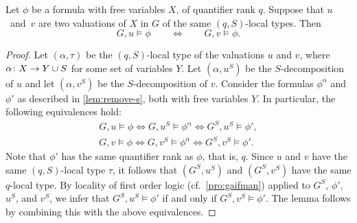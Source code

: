 \begin{lemma}\label{lem:coloring}
	Let $\phi$ be a formula with
free variables $X$, of quantifier rank $q$.
	Suppose that $u$~and~$v$ are two valuations of $X$  in $G$ of the same $(q,S)$-local types.
	Then $$G,u\models \phi\qquad \iff\qquad G,v\models \phi.$$
\end{lemma}
\begin{proof}
Let $(\alpha,\tau)$ be the $(q,S)$-local type of the valuations $u$ and $v$, where $\alpha\colon X\to Y\cup S$ for some set of variables $Y$. Let $(\alpha,u^S)$ be the $S$-decomposition of $u$
and let $(\alpha,v^S)$ be the $S$-decomposition of $v$.
	Consider the formulas $\phi^{\alpha}$ and $\phi'$ as described in \cref{lem:remove-s}, both with free variables $Y$.
	In particular, the following equivalences hold:
	\begin{align*}
	G,u\models\phi\iff G,u^S\models\phi^{\alpha}\iff G^S,u^S\models\phi',\\
	G,v\models\phi\iff G,v^S\models\phi^{\alpha}\iff G^S,v^S\models\phi'.
	\end{align*}
		Note that $\phi'$ has the same quantifier rank as  $\phi$, that is, $q$.
		Since $u$ and $ v$ have the same $(q,S)$-local type $\tau$, it follows that $(G^S,u^S)$ and $(G^S,v^S)$ have the same   $q$-local type.
		By locality of first order logic (cf.~\cref{pro:gaifman}) applied to $G^S$, $\phi'$, $ u^S$, and $v^S$, we infer that $G^S,u^S\models\phi'$ if and only if $G^S,v^S\models\phi'$.
		The lemma follows by combining this with the above equivalences.
\end{proof}



